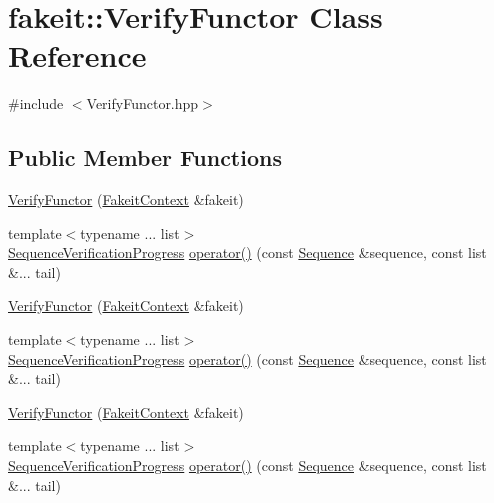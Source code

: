 \hypertarget{classfakeit_1_1VerifyFunctor}{}\section{fakeit\+::Verify\+Functor Class Reference}
\label{classfakeit_1_1VerifyFunctor}


{\ttfamily \#include $<$Verify\+Functor.\+hpp$>$}

\subsection*{Public Member Functions}
\begin{DoxyCompactItemize}
\item 
\mbox{\hyperlink{classfakeit_1_1VerifyFunctor_ae85e5c4e5d0964fe41d78ffa7be7f12d}{Verify\+Functor}} (\mbox{\hyperlink{structfakeit_1_1FakeitContext}{Fakeit\+Context}} \&fakeit)
\item 
{\footnotesize template$<$typename ... list$>$ }\\\mbox{\hyperlink{classfakeit_1_1SequenceVerificationProgress}{Sequence\+Verification\+Progress}} \mbox{\hyperlink{classfakeit_1_1VerifyFunctor_a402a212d37bb558e53493cb9ab866947}{operator()}} (const \mbox{\hyperlink{classfakeit_1_1Sequence}{Sequence}} \&sequence, const list \&... tail)
\item 
\mbox{\hyperlink{classfakeit_1_1VerifyFunctor_ae85e5c4e5d0964fe41d78ffa7be7f12d}{Verify\+Functor}} (\mbox{\hyperlink{structfakeit_1_1FakeitContext}{Fakeit\+Context}} \&fakeit)
\item 
{\footnotesize template$<$typename ... list$>$ }\\\mbox{\hyperlink{classfakeit_1_1SequenceVerificationProgress}{Sequence\+Verification\+Progress}} \mbox{\hyperlink{classfakeit_1_1VerifyFunctor_a402a212d37bb558e53493cb9ab866947}{operator()}} (const \mbox{\hyperlink{classfakeit_1_1Sequence}{Sequence}} \&sequence, const list \&... tail)
\item 
\mbox{\hyperlink{classfakeit_1_1VerifyFunctor_ae85e5c4e5d0964fe41d78ffa7be7f12d}{Verify\+Functor}} (\mbox{\hyperlink{structfakeit_1_1FakeitContext}{Fakeit\+Context}} \&fakeit)
\item 
{\footnotesize template$<$typename ... list$>$ }\\\mbox{\hyperlink{classfakeit_1_1SequenceVerificationProgress}{Sequence\+Verification\+Progress}} \mbox{\hyperlink{classfakeit_1_1VerifyFunctor_a402a212d37bb558e53493cb9ab866947}{operator()}} (const \mbox{\hyperlink{classfakeit_1_1Sequence}{Sequence}} \&sequence, const list \&... tail)

\end{DoxyCompactItemize}
